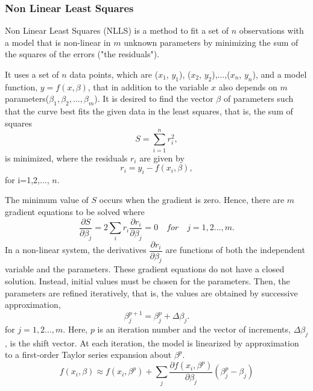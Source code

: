 \documentclass[journal]{IEEEtran}
\begin{document}
\subsubsection{\textbf{Non Linear Least Squares}}
\par Non Linear Least Squares (NLLS) is a method to fit a set of $n$ observations with a model that is non-linear in $m$ unknown parameters by minimizing the sum of the squares of the errors ("the residuals").
\par
It uses a set of $n$ data points, which are ($x_1$, $y_1$), ($x_2$, $y_2$),$\dots$,($x_n$, $y_n$), and a model function, $y= f(x, \beta)$, that in addition to the variable $x$ also depends on $m$ parameters($\beta_1,\beta_2,...,\beta_m$).
It is desired to find the vector $\beta$ of parameters such that the curve best fits the given data in the least squares, that is, the sum of squares
\begin{equation}
    S=\sum_{i=1}^{n}r_i^2 ,
\end{equation}
is minimized, where the residuals $r_i$ are given by
\begin{equation}
    r_i = y_i - f(x_i,\beta),
\end{equation}
for i=1,2,$\dots$, $n$.
\par
The minimum value of $S$ occurs when the gradient is zero. Hence, there are $m$ gradient equations to be solved where
\begin{equation}
    \dfrac{\partial S}{\partial \beta_j}=2\sum_i r_i\dfrac{\partial r_i}{\partial \beta_j}=0  \quad for \quad j=1,2...,m.
\end{equation}
In a non-linear system, the derivatives $\dfrac{\partial r_i}{\partial \beta_j}$ are functions of both the independent
variable and the parameters. These gradient equations do not have a closed solution. Instead, initial values must be chosen for the
parameters. Then, the parameters are refined iteratively, that is, the values are obtained by successive approximation,
\begin{equation}
    \beta_j^{p+1}=\beta^p_j+\Delta \beta_j.
\end{equation}
for $j=1,2...,m.$ Here, $p$ is an iteration number and the vector of increments, $\Delta \beta_j$, is the shift vector. At each iteration, the model is linearized by approximation to a first-order Taylor series expansion about $\beta^p$.
\begin{equation}
    f(x_i,\beta)\approx f(x_i,\beta^p) +\sum_j \dfrac{\partial f(x_i, \beta^p)}{\partial \beta_j} \left(\beta^p_j -\beta_j \right)
\end{equation}
\end{document}
